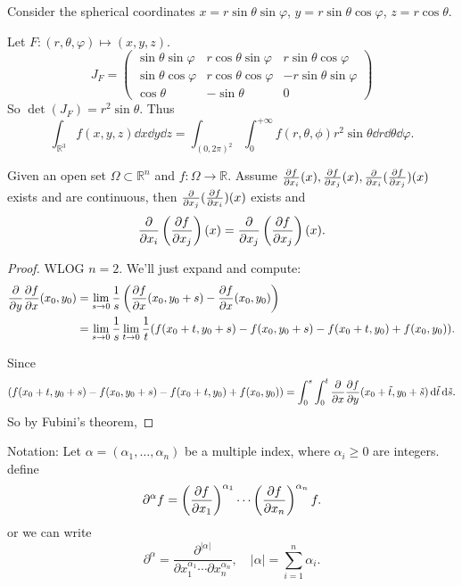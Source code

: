 \begin{example}
    Consider the spherical coordinates $x=r\sin \theta \sin \varphi$,
	$y = r\sin\theta \cos\varphi$, $z = r\cos\theta$.

	Let $F: (r,\theta,\varphi)\mapsto (x,y,z)$.
	\[
	J_F = \begin{pmatrix}
		\sin\theta\sin\varphi &r\cos\theta\sin\varphi &r\sin\theta\cos\varphi\\
		\sin\theta\cos\varphi &r\cos\theta\cos\varphi &-r\sin\theta\sin\varphi\\
		\cos\theta &-\sin\theta &0
	\end{pmatrix}
	\]
	So $\det(J_F) = r^2\sin\theta$. Thus
	\[
	\int_{\mathbb{R}^{3}} f(x,y,z)\dd x\dd y\dd z
	= \int_{(0,2\pi)^2}\int_{0}^{+\infty}
	f(r, \theta, \phi)r^2\sin\theta \dd r\dd \theta \dd \varphi.
	\]
\end{example}

\begin{theorem}
    Given an open set $\Omega \subset \mathbb{R}^{n}$ and $f: \Omega\to \mathbb{R}$.
	Assume $\frac{\partial f}{\partial x_i}(x), \frac{\partial f}{\partial x_j}(x), \frac{\partial }{\partial x_i}(\frac{\partial f}{\partial x_j})(x)$ exists
	and are continuous, then
	$\frac{\partial }{\partial x_j}(\frac{\partial f}{\partial x_i})(x)$ exists and
	\[
	\frac{\partial }{\partial x_i}\left(\frac{\partial f}{\partial x_j}\right)(x)
	= \frac{\partial }{\partial x_j}\left(\frac{\partial f}{\partial x_j}\right)(x).
	\]
\end{theorem}
\begin{proof}[Proof]
    WLOG $n = 2$.
	We'll just expand and compute:
	\begin{align*}
		\frac{\partial }{\partial y}\frac{\partial f}{\partial x}(x_0, y_0)
		&= \lim_{s\to 0}\frac{1}{s}
		\left(\frac{\partial f}{\partial x}(x_0,y_0+s) - \frac{\partial f}{\partial x}(x_0,y_0)\right)\\
		&= \lim_{s\to 0}\frac{1}{s} \lim_{t\to 0} \frac{1}{t}
		(f(x_0+t, y_0+s) - f(x_0, y_0+s) - f(x_0+t, y_0) + f(x_0,y_0)).
	\end{align*}

	Since
	\[
		(f(x_0+t, y_0+s) - f(x_0, y_0+s) - f(x_0+t, y_0) + f(x_0,y_0))
		= \int_{0}^{s} \int_{0}^{t} \frac{\partial }{\partial x}\frac{\partial f}{\partial y}
		(x_0+\tilde t,y_0+\tilde s)\mathop{}\!\mathrm{d} \tilde t\mathop{}\!\mathrm{d} \tilde s.
	\]
	So by Fubini's theorem,
\end{proof}

Notation:
Let $\alpha = (\alpha_1,\dots,\alpha_n)$ be a multiple index,
where $\alpha_i\ge 0$ are integers.
define
\[
\partial^\alpha f = \left(\frac{\partial f}{\partial x_1}\right)^{\alpha_1}\cdots
\left(\frac{\partial f}{\partial x_n}\right)^{\alpha_n}f.
\]
or we can write
\[
\partial^\alpha = \frac{\partial^{|\alpha|}}{\partial x_1^{\alpha_1}\cdots
\partial x_n^{\alpha_n}},\quad |\alpha| = \sum_{i=1}^{n} \alpha_i.
\]

